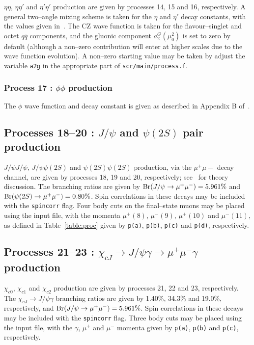 \documentclass[12pt]{article}
\begin{document}
$\eta\eta$, $\eta\eta'$ and $\eta'\eta'$ production are given by processes 14, 15 and 16, respectively. A general two--angle mixing scheme is 
taken for the $\eta$ and $\eta'$ decay constants, with the values given in~\cite{Harland-Lang:2013ncy}. The CZ wave function is taken for the 
flavour--singlet and octet $q\overline{q}$ components, and the gluonic component $a_2^G(\mu_0^2)$ is set to zero by default (although a non--zero 
contribution will enter at higher scales due to the wave function evolution). A non--zero starting value may be taken by adjust the variable 
\texttt{a2g} in the appropriate part of \texttt{scr/main/process.f}.

\subsubsection{Process 17 : $\phi\phi$ production}

The $\phi$ wave function and decay constant is given as described in Appendix B of~\cite{Harland-Lang:2014efa}.

\subsection{Processes 18--20 : $J/\psi$ and $\psi(2S)$ pair production}

$J/\psi J/\psi$, $J/\psi\psi(2S)$ and $\psi(2S)\psi(2S)$ production, via the $\mu^+\mu-$ decay channel, are given by processes 18, 19 and 20, 
respectively; see~\cite{Harland-Lang:2014efa} for theory discussion. The branching ratios are given by ${\rm Br}(J/\psi \to \mu^+\mu^-)=5.961\%$ 
and ${\rm Br}(\psi(2S) \to \mu^+\mu^-)=0.80\%$. Spin correlations in these decays may be included with the \texttt{spincorr} flag. Four body cuts 
on the final--state muons may be placed using the input file, with the momenta $\mu^+(8)$, $\mu^-(9)$, $\mu^+(10)$ and $\mu^-(11)$, as defined in 
Table~\ref{table:proc} given by \texttt{p(a)}, \texttt{p(b)}, \texttt{p(c)} and \texttt{p(d)}, respectively.

\subsection{Processes 21--23 : $\chi_{cJ}\to J/\psi\gamma\to \mu^+\mu^-\gamma$ production}

$\chi_{c0}$, $\chi_{c1}$ and $\chi_{c2}$ production are given by processes 21, 22 and 23, respectively. The $\chi_{cJ}\to J/\psi \gamma$ branching 
ratios are given by 1.40\%, 34.3\% and 19.0\%, respectively, and ${\rm Br}(J/\psi \to \mu^+\mu^-)=5.961\%$. Spin correlations in these decays may 
be included with the \texttt{spincorr} flag. Three body cuts may be placed using the input file, with the $\gamma$, $\mu^+$ and $\mu^-$ momenta 
given by \texttt{p(a)}, \texttt{p(b)} and \texttt{p(c)}, respectively.
\end{document}
